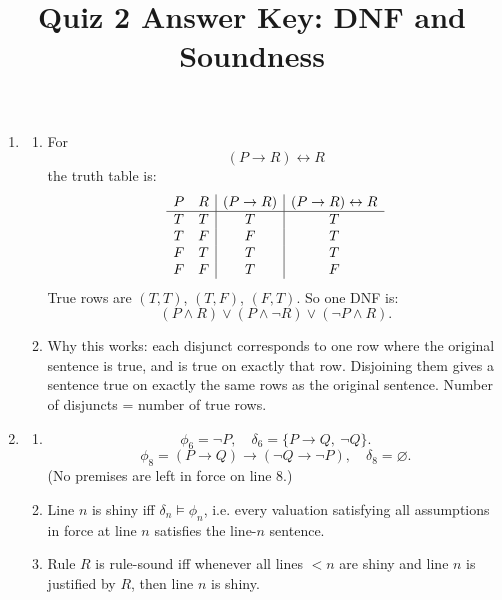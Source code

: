 \documentclass[12pt]{article}
\title{Quiz 2 Answer Key: DNF and Soundness}
\author{}
\date{}
\newcommand{\forces}{\models}
\begin{document}
\maketitle

\begin{enumerate}
    \item
    \begin{enumerate}[label=(\alph*)]
        \item For
        \[
        (P \rightarrow R)\leftrightarrow R
        \]
        the truth table is:
        \[
        \begin{array}{c c | c | c}
        P & R & (P\rightarrow R) & (P\rightarrow R)\leftrightarrow R\\
        \hline
        T & T & T & T\\
        T & F & F & T\\
        F & T & T & T\\
        F & F & T & F
        \end{array}
        \]
        True rows are \((T,T)\), \((T,F)\), \((F,T)\). So one DNF is:
        \[
        (P\land R)\vee(P\land\neg R)\vee(\neg P\land R).
        \]

        \item Why this works:
        each disjunct corresponds to one row where the original sentence is true, and is true on exactly that row. Disjoining them gives a sentence true on exactly the same rows as the original sentence. Number of disjuncts = number of true rows.
    \end{enumerate}

    \item
    \begin{enumerate}[label=(\alph*)]
        \item
        \[
        \phi_6=\neg P,\quad \delta_6=\{P\rightarrow Q,\ \neg Q\}.
        \]
        \[
        \phi_8=(P\rightarrow Q)\rightarrow(\neg Q\rightarrow\neg P),\quad \delta_8=\varnothing.
        \]
        (No premises are left in force on line 8.)

        \item Line \(n\) is shiny iff \(\delta_n\forces \phi_n\), i.e. every valuation satisfying all assumptions in force at line \(n\) satisfies the line-\(n\) sentence.

        \item Rule \(R\) is rule-sound iff whenever all lines \(<n\) are shiny and line \(n\) is justified by \(R\), then line \(n\) is shiny.
    \end{enumerate}


\end{enumerate}
\end{document}
